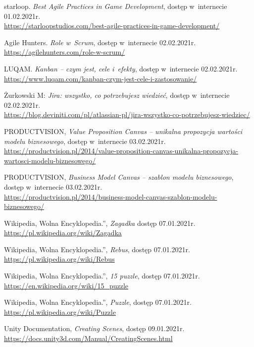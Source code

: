 \documentclass[oneside,polski,logo]{amuthesis}
\begin{document}
\begin{thebibliography}{100}
starloop. \emph{Best Agile Practices in Game Development}, dostęp w~internecie 01.02.2021r.\\
\url{https://starloopstudios.com/best-agile-practices-in-game-development/}

Agile Hunters. \emph{Role w~Scrum}, dostęp w~internecie 02.02.2021r.\\
\url{https://agilehunters.com/role-w-scrum/}

LUQAM. \emph{Kanban – czym jest, cele i~efekty}, dostęp w~internecie 02.02.2021r.\\
\url{https://www.luqam.com/kanban-czym-jest-cele-i-zastosowanie/}

Żurkowski M: \emph{Jira: wszystko, co potrzebujesz wiedzieć}, dostęp w~internecie 02.02.2021r.\\
\url{https://blog.deviniti.com/pl/atlassian-pl/jira-wszystko-co-potrzebujesz-wiedziec/}

PRODUCTVISION, \emph{Value Proposition Canvas – unikalna propozycja wartości modelu biznesowego}, dostęp w~internecie 03.02.2021r.\\
\url{https://productvision.pl/2014/value-proposition-canvas-unikalna-propozycja-wartosci-modelu-biznesowego/}

PRODUCTVISION, \emph{Business Model Canvas – szablon modelu biznesowego}, dostęp w~internecie 03.02.2021r.\\
\url{https://productvision.pl/2014/business-model-canvas-szablon-modelu-biznesowego/}

Wikipedia, Wolna Encyklopedia.”, \emph{Zagadka} dostęp 07.01.2021r.
\\ \url{https://pl.wikipedia.org/wiki/Zagadka}

Wikipedia, Wolna Encyklopedia.”, \emph{Rebus}, dostęp 07.01.2021r.
\\ \url{https://pl.wikipedia.org/wiki/Rebus}

Wikipedia, Wolna Encyklopedia.”, \emph{15 puzzle}, dostęp 07.01.2021r.
\\ \url{https://en.wikipedia.org/wiki/15\_puzzle}

Wikipedia, Wolna Encyklopedia.”, \emph{Puzzle}, dostęp 07.01.2021r.
\\ \url{https://pl.wikipedia.org/wiki/Puzzle}

Unity Documentation, \emph{Creating Scenes}, dostęp 09.01.2021r.
\\ \url{https://docs.unity3d.com/Manual/CreatingScenes.html}


\end{thebibliography}
\end{document}

